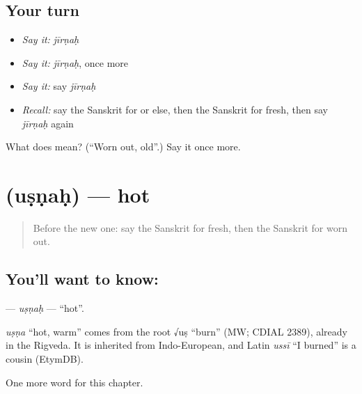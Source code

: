 \subsection*{Your turn}
\begin{itemize}
\raggedright
  \item \emph{Say it:} \emph{jīrṇaḥ}
  \item \emph{Say it:} \emph{jīrṇaḥ}, once more
  \item \emph{Say it:} say \emph{jīrṇaḥ}
  \item \emph{Recall:} say the Sanskrit for or else, then the Sanskrit for fresh, then say \emph{jīrṇaḥ} again
\end{itemize}

\begin{tcolorbox}[breakable,colback=teal!4,colframe=teal!35!black,title={Before you move on}]
What does  mean? (\textquotedblleft{}Worn out, old\textquotedblright{}.) Say it once more.
\end{tcolorbox}
\section[\texorpdfstring{\sk{उष्णः} (uṣṇaḥ)}{उष्णः (uṣṇaḥ)}]{ (uṣṇaḥ) — hot}

\label{lesson:SA-C155-usnah}



\begin{quote}
Before the new one: say the Sanskrit for fresh, then the Sanskrit for worn out.
\end{quote}

\subsection*{You'll want to know: }
\textbf{} — \emph{uṣṇaḥ} — \textquotedblleft{}hot\textquotedblright{}.

\begin{cousinweb}
\emph{uṣṇa} \textquotedblleft{}hot, warm\textquotedblright{} comes from the root √uṣ \textquotedblleft{}burn\textquotedblright{} (MW; CDIAL 2389), already in the Rigveda. It is inherited from Indo-European, and Latin \emph{ussī} \textquotedblleft{}I burned\textquotedblright{} is a cousin (EtymDB).
\end{cousinweb}

\begin{grammarlens}[title={What you've built}]
One more word for this chapter.
\end{grammarlens}

